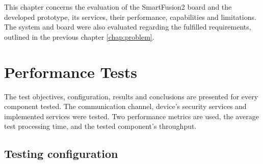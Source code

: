\cleardoublepage
\label{chap:evaluation}

This chapter concerns the evaluation of the SmartFusion2 board and the developed prototype, its services, their performance, capabilities and limitations. The system and board were also evaluated regarding the fulfilled requirements, outlined in the previous chapter \ref{chap:problem}.

\section{Performance Tests}\label{chap:evaluation:performance}

The test objectives, configuration, results and conclusions are presented for every component tested.
The communication channel, device's security services and implemented services were tested.
Two performance metrics are used, the average test processing time, and the tested component's throughput.

\subsection{Testing configuration}\label{chap:evaluation:performance:config}

